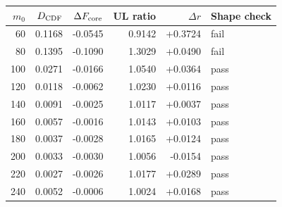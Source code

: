\begin{tabular}{rrrrrl}
\toprule
$m_0$ & $D_{\rm CDF}$ & $\Delta F_{\rm core}$ & UL ratio & $\Delta r$ & Shape check \\
\midrule
60 & 0.1168 & -0.0545 & 0.9142 & +0.3724 & fail \\
80 & 0.1395 & -0.1090 & 1.3029 & +0.0490 & fail \\
100 & 0.0271 & -0.0166 & 1.0540 & +0.0364 & pass \\
120 & 0.0118 & -0.0062 & 1.0230 & +0.0116 & pass \\
140 & 0.0091 & -0.0025 & 1.0117 & +0.0037 & pass \\
160 & 0.0057 & -0.0016 & 1.0143 & +0.0103 & pass \\
180 & 0.0037 & -0.0028 & 1.0165 & +0.0124 & pass \\
200 & 0.0033 & -0.0030 & 1.0056 & -0.0154 & pass \\
220 & 0.0027 & -0.0026 & 1.0177 & +0.0289 & pass \\
240 & 0.0052 & -0.0006 & 1.0024 & +0.0168 & pass \\
\bottomrule
\end{tabular}
